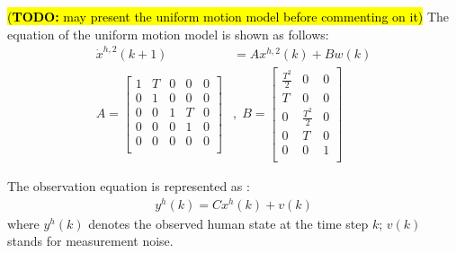 \documentclass[letterpaper, 10 pt, conference]{ieeeconf}
\newcommand{\todohere}[1]{\hl{(\textbf{TODO:} #1)}}
\begin{document}
	
	
	
	
	\todohere{may present the uniform motion model before commenting on it}
	The equation of the uniform motion model is shown as follows:  
	\begin{subequations}
		\begin{align}
		\dot{x}^{h,2}(k+1)&= Ax^{h,2}(k)+Bw(k)\label{eqn:h_d_dyn}\\
		A=\left[
		\begin{array}{ccccc}
		1& T& 0& 0& 0\\
		0& 1& 0& 0& 0\\
		0& 0& 1& T& 0\\
		0& 0& 0& 1& 0\\
		0& 0& 0& 0& 0\\
		\end{array}\right]&,\;
		B=\left[
		\begin{array}{ccc}
		\frac{T^2}{2}& 0& 0\\
		T& 0& 0\\
		0& \frac{T^2}{2}& 0\\
		0& T& 0\\
		0& 0& 1\\
		\end{array}\right]
		\end{align}
	\end{subequations}
	
	The observation equation is represented as : 
	\begin{subequations}
		\begin{align}
		y^h(k)=Cx^h(k)+v(k)\label{eqn:n_observation}
		\end{align}
	\end{subequations}
	where $y^h(k)$ denotes the observed human state at the time step $k$; $v(k)$ stands for measurement noise. 
	
\end{document}

